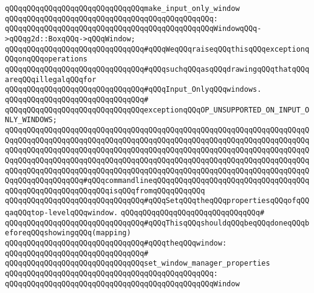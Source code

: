 \newline
\verb|qQQqqQQqqQQqqQQqqQQqqQQqqQQqqQQqmake_input_only_window|\newline
\verb|qQQqqQQqqQQqqQQqqQQqqQQqqQQqqQQqqQQqqQQqqQQqqQQq:|\newline
\verb|qQQqqQQqqQQqqQQqqQQqqQQqqQQqqQQqqQQqqQQqqQQqqQQqWindowqQQq->qQQqg2d::BoxqQQq->qQQqWindow;|\newline
\newline
\verb|qQQqqQQqqQQqqQQqqQQqqQQqqQQqqQQq#qQQqWeqQQqraiseqQQqthisqQQqexceptionqQQqonqQQqoperations|\newline
\verb|qQQqqQQqqQQqqQQqqQQqqQQqqQQqqQQq#qQQqsuchqQQqasqQQqdrawingqQQqthatqQQqareqQQqillegalqQQqfor|\newline
\verb|qQQqqQQqqQQqqQQqqQQqqQQqqQQqqQQq#qQQqInput_OnlyqQQqwindows.|\newline
\verb|qQQqqQQqqQQqqQQqqQQqqQQqqQQqqQQq#|\newline
\verb|qQQqqQQqqQQqqQQqqQQqqQQqqQQqqQQqexceptionqQQqOP_UNSUPPORTED_ON_INPUT_ONLY_WINDOWS;|\newline
\verb|qQQqqQQqqQQqqQQqqQQqqQQqqQQqqQQqqQQqqQQqqQQqqQQqqQQqqQQqqQQqqQQqqQQqqQQqqQQqqQQqqQQqqQQqqQQqqQQqqQQqqQQqqQQqqQQqqQQqqQQqqQQqqQQqqQQqqQQqqQQqqQQqqQQqqQQqqQQqqQQqqQQqqQQqqQQqqQQqqQQqqQQqqQQqqQQqqQQqqQQqqQQqqQQqqQQqqQQqqQQqqQQqqQQqqQQqqQQqqQQqqQQqqQQqqQQqqQQqqQQqqQQqqQQqqQQqqQQqqQQqqQQqqQQqqQQqqQQqqQQqqQQqqQQqqQQqqQQqqQQqqQQqqQQqqQQqqQQqqQQqqQQqqQQqqQQqqQQqqQQqqQQqqQQq#qQQqcommandlineqQQqqQQqqQQqqQQqqQQqqQQqqQQqqQQqqQQqqQQqqQQqqQQqqQQqqQQqqQQqisqQQqfromqQQqqQQqqQQq|\newline
\verb|qQQqqQQqqQQqqQQqqQQqqQQqqQQqqQQq#qQQqSetqQQqtheqQQqpropertiesqQQqofqQQqaqQQqtop-levelqQQqwindow.|\newline
\verb|qQQqqQQqqQQqqQQqqQQqqQQqqQQqqQQq#|\newline
\verb|qQQqqQQqqQQqqQQqqQQqqQQqqQQqqQQq#qQQqThisqQQqshouldqQQqbeqQQqdoneqQQqbeforeqQQqshowingqQQq(mapping)|\newline
\verb|qQQqqQQqqQQqqQQqqQQqqQQqqQQqqQQq#qQQqtheqQQqwindow:|\newline
\verb|qQQqqQQqqQQqqQQqqQQqqQQqqQQqqQQq#|\newline
\verb|qQQqqQQqqQQqqQQqqQQqqQQqqQQqqQQqset_window_manager_properties|\newline
\verb|qQQqqQQqqQQqqQQqqQQqqQQqqQQqqQQqqQQqqQQqqQQqqQQq:|\newline
\verb|qQQqqQQqqQQqqQQqqQQqqQQqqQQqqQQqqQQqqQQqqQQqqQQqWindow|\newline
